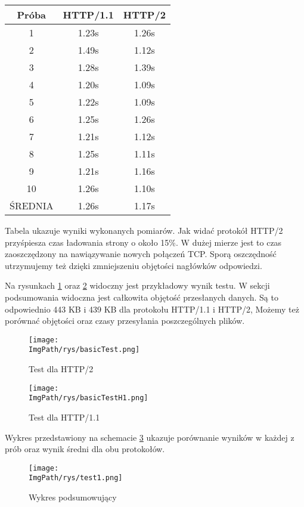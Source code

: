 \documentclass[a4paper,12pt,twoside,openany]{report}
\newcommand{\ImgPath}{.}
\begin{document}
\begin{tabular}{c|c|c}
Próba & HTTP/1.1 & HTTP/2 \\ \hline
1 & 1.23s & 1.26s\\
2 & 1.49s & 1.12s\\
3 & 1.28s & 1.39s\\
4 & 1.20s & 1.09s\\
5 & 1.22s & 1.09s\\
6 & 1.25s & 1.26s\\
7 & 1.21s & 1.12s\\
8 & 1.25s & 1.11s\\
9 & 1.21s & 1.16s\\
10 & 1.26s & 1.10s\\ \hline
ŚREDNIA & 1.26s & 1.17s\\
\end{tabular}

Tabela ukazuje wyniki wykonanych pomiarów.
Jak widać protokół HTTP/2 przyśpiesza czas ładowania strony o około 15\%.
W dużej mierze jest to czas zaoszczędzony na nawiązywanie nowych połączeń TCP.
Sporą oszczędność utrzymujemy też dzięki zmniejszeniu objętości nagłówków odpowiedzi.

Na rysunkach \ref{schematBasicTest} oraz \ref{schematBasicTestH1} widoczny jest przykładowy wynik testu.
W sekcji podsumowania widoczna jest całkowita objętość przesłanych danych. Są to odpowiednio 443 KB i 439 KB dla protokołu HTTP/1.1 i HTTP/2,
Możemy też porównać objętości oraz czasy przesyłania poszczególnych plików.

\begin{figure}[!htbp]
	\begin{center}
\centering
\texttt{[image: \\ImgPath/rys/basicTest.png]}
\end{center}
	\caption{Test dla HTTP/2}
	\label{schematBasicTest}
\end{figure}

\begin{figure}[!htbp]
	\begin{center}
\centering
\texttt{[image: \\ImgPath/rys/basicTestH1.png]}
\end{center}
	\caption{Test dla HTTP/1.1}
	\label{schematBasicTestH1}
\end{figure}

Wykres przedstawiony na schemacie \ref{schematTest1} ukazuje porównanie wyników w każdej z prób oraz wynik średni dla obu protokołów.

\begin{figure}[!htbp]
	\begin{center}
\centering
\texttt{[image: \\ImgPath/rys/test1.png]}
\end{center}
	\caption{Wykres podsumowujący}
	\label{schematTest1}
\end{figure}
\end{document}
